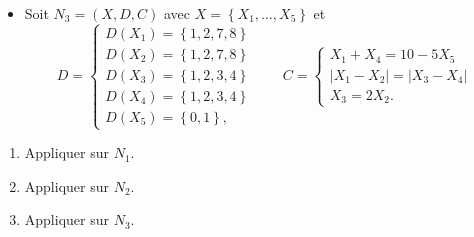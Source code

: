 \begin{td-exo}
\begin{itemize}
        \item Soit \(N_3 = (X, D, C)\) avec \(X = \left\{ X_1, \ldots, X_5\right\}\) et 
        \begin{equation*}
            D = 
            \begin{cases}
                D(X_1) = \left\{1, 2, 7, 8\right\} \\
                D(X_2) = \left\{1, 2, 7, 8\right\} \\
                D(X_3) = \left\{1, 2, 3, 4\right\} \\
                D(X_4) = \left\{1, 2, 3, 4\right\} \\
                D(X_5) = \left\{0, 1\right\},
            \end{cases} \qquad
            C = 
            \begin{cases}
                X_1 + X_4 = 10 - 5X_5 \\
                \vert X_1 - X_2 \vert = \vert X_3 - X_4 \vert \\
                X_3 = 2X_2.
            \end{cases}
        \end{equation*}
    \end{itemize}

    \begin{enumerate}
        \item Appliquer  sur \(N_1\).
        \item Appliquer  sur \(N_2\).
        \item Appliquer  sur \(N_3\).
    \end{enumerate}
\end{td-exo}


